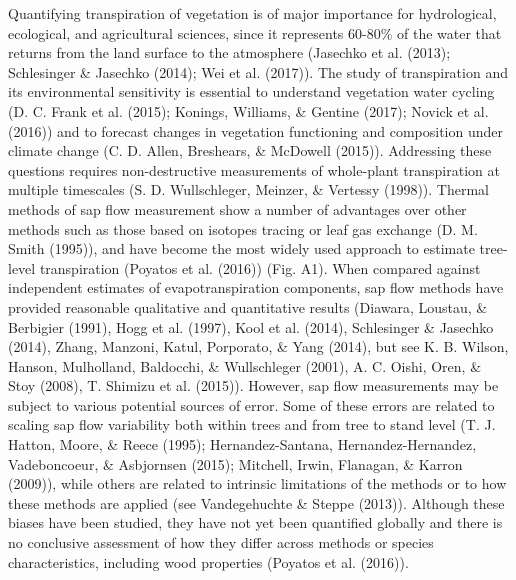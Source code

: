 \documentclass[11pt,twoside]{reedthesis}
\begin{document}
Quantifying transpiration of vegetation is of major importance for
hydrological, ecological, and agricultural sciences, since it represents
60-80\% of the water that returns from the land surface to the
atmosphere (Jasechko et al. (2013); Schlesinger \& Jasechko (2014); Wei
et al. (2017)). The study of transpiration and its environmental
sensitivity is essential to understand vegetation water cycling (D. C.
Frank et al. (2015); Konings, Williams, \& Gentine (2017); Novick et al.
(2016)) and to forecast changes in vegetation functioning and
composition under climate change (C. D. Allen, Breshears, \& McDowell
(2015)). Addressing these questions requires non-destructive
measurements of whole-plant transpiration at multiple timescales (S. D.
Wullschleger, Meinzer, \& Vertessy (1998)). Thermal methods of sap flow
measurement show a number of advantages over other methods such as those
based on isotopes tracing or leaf gas exchange (D. M. Smith (1995)), and
have become the most widely used approach to estimate tree-level
transpiration (Poyatos et al. (2016)) (Fig. A1). When compared against
independent estimates of evapotranspiration components, sap flow methods
have provided reasonable qualitative and quantitative results (Diawara,
Loustau, \& Berbigier (1991), Hogg et al. (1997), Kool et al. (2014),
Schlesinger \& Jasechko (2014), Zhang, Manzoni, Katul, Porporato, \&
Yang (2014), but see K. B. Wilson, Hanson, Mulholland, Baldocchi, \&
Wullschleger (2001), A. C. Oishi, Oren, \& Stoy (2008), T. Shimizu et
al. (2015)). However, sap flow measurements may be subject to various
potential sources of error. Some of these errors are related to scaling
sap flow variability both within trees and from tree to stand level (T.
J. Hatton, Moore, \& Reece (1995); Hernandez-Santana,
Hernandez-Hernandez, Vadeboncoeur, \& Asbjornsen (2015); Mitchell,
Irwin, Flanagan, \& Karron (2009)), while others are related to
intrinsic limitations of the methods or to how these methods are applied
(see Vandegehuchte \& Steppe (2013)). Although these biases have been
studied, they have not yet been quantified globally and there is no
conclusive assessment of how they differ across methods or species
characteristics, including wood properties (Poyatos et al. (2016)).\par
\end{document}
